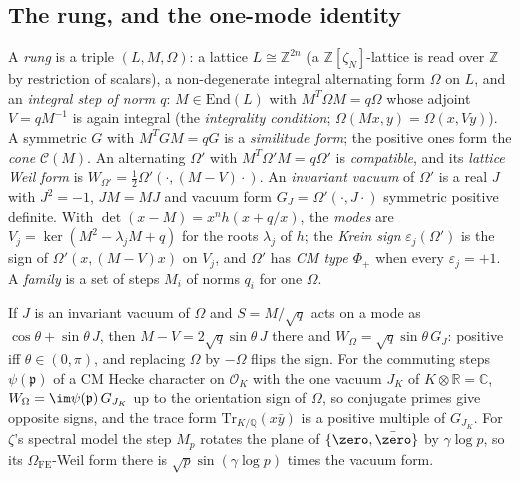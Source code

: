 \subsection{The rung, and the one-mode identity}

\begin{definition}
\label{def:gkp-ladder-rung}
A \emph{rung} is a triple $(L,M,\Omega)$: a lattice $L\cong\mathbb Z^{2n}$ (a $\mathbb Z[\zeta_N]$-lattice is read over $\mathbb Z$ by restriction of scalars), a non-degenerate %
integral alternating form $\Omega$ on $L$, and an \emph{integral step of norm $q$}: $M\in\mathrm{End}(L)$ with $M^T\Omega M = q\Omega$ whose adjoint $V = qM^{-1}$ is again %
integral (the \emph{integrality condition}; $\Omega(Mx,y) = \Omega(x,Vy)$). A symmetric $G$ with $M^TGM = qG$ is a \emph{similitude form}; the positive ones form the \emph{cone} %
$\mathcal C(M)$. An alternating $\Omega'$ with $M^T\Omega'M = q\Omega'$ is \emph{compatible}, and its \emph{lattice Weil form} is $W_{\Omega'} = %
\tfrac12\Omega'(\cdot,(M-V)\cdot)$. An \emph{invariant vacuum} of $\Omega'$ is a real $J$ with $J^2 = -1$, $JM = MJ$ and vacuum form $G_J = \Omega'(\cdot,J\cdot)$ symmetric %
positive definite. With $\det(x-M) = x^nh(x+q/x)$, the \emph{modes} are $V_j = \ker(M^2-\lambda_jM+q)$ for the roots $\lambda_j$ of $h$; the \emph{Krein sign}
$\varepsilon_j(\Omega')$ is the sign of $\Omega'(x,(M-V)x)$ on $V_j$, and $\Omega'$ has \emph{CM type $\Phi_+$} when every $\varepsilon_j = +1$. A \emph{family} is a set of steps %
$M_i$ of norms $q_i$ for one $\Omega$. %
\end{definition}
\begin{lemma} %
\label{lem:gkp-one-mode-weil-sine} 
If $J$ is an invariant vacuum of $\Omega$ and $S = M/\sqrt q$ acts on a mode as $\cos\theta+\sin\theta\,J$, then $M-V = 2\sqrt q\sin\theta\,J$ there and $W_\Omega = \sqrt %
q\sin\theta\,G_J$: positive iff $\theta\in(0,\pi)$, and replacing $\Omega$ by $-\Omega$ flips the sign. For the commuting steps $\psi(\mathfrak p)$ of a CM Hecke character on %
$\mathcal O_K$ with the one vacuum $J_K$ of $K\otimes\mathbb R = \mathbb C$, $W_\Omega = \im\psi(\mathfrak p)\,G_{J_K}$ up to the orientation sign of $\Omega$, so conjugate %
primes give opposite signs, and the trace form $\mathrm{Tr}_{K/\mathbb Q}(x\bar y)$ is a positive multiple of $G_{J_K}$. For $\zeta$'s spectral model the step $M_p$ rotates the
plane of $\{\zero,\bar\zero\}$ by $\gamma\log p$, so its $\Omega_{\mathrm{FE}}$-Weil form there is $\sqrt p\sin(\gamma\log p)$ times the vacuum form. %
\end{lemma}
